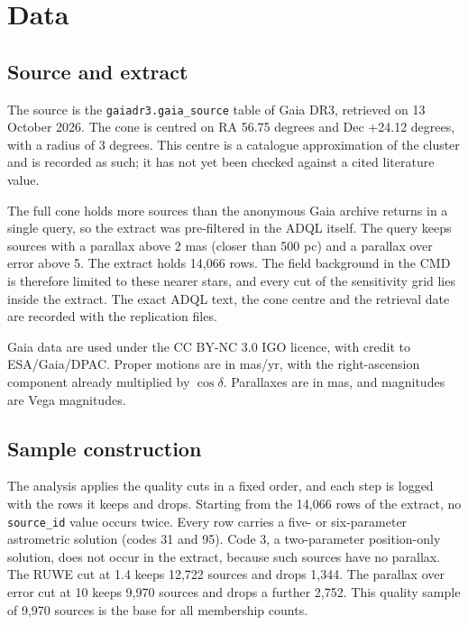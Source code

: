 \documentclass[11pt]{article}
\begin{document}
\section{Data}

\subsection{Source and extract}

The source is the \texttt{gaiadr3.gaia\_source} table of Gaia DR3, retrieved on 13 October 2026. The cone is centred on RA 56.75 degrees and Dec +24.12 degrees, with a radius of 3 degrees. This centre is a catalogue approximation of the cluster and is recorded as such; it has not yet been checked against a cited literature value.

The full cone holds more sources than the anonymous Gaia archive returns in a single query, so the extract was pre-filtered in the ADQL itself. The query keeps sources with a parallax above 2 mas (closer than 500 pc) and a parallax over error above 5. The extract holds 14,066 rows.
The field background in the CMD is therefore limited to these nearer stars, and every cut of the sensitivity grid lies inside the extract. The exact ADQL text, the cone centre and the retrieval date are recorded with the replication files.

Gaia data are used under the CC BY-NC 3.0 IGO licence, with credit to ESA/Gaia/DPAC. Proper motions are in mas/yr, with the right-ascension component already multiplied by $\cos\delta$. Parallaxes are in mas, and magnitudes are Vega magnitudes.

\subsection{Sample construction}

The analysis applies the quality cuts in a fixed order, and each step is logged with the rows it keeps and drops. Starting from the 14,066 rows of the extract, no \texttt{source\_id} value occurs twice. Every row carries a five- or six-parameter astrometric solution (codes 31 and 95). Code 3, a two-parameter position-only solution, does not occur in the extract, because such sources have no parallax. The RUWE cut at 1.4 keeps 12,722 sources and drops 1,344.
The parallax over error cut at 10 keeps 9,970 sources and drops a further 2,752.
This quality sample of 9,970 sources is the base for all membership counts.
\end{document}

